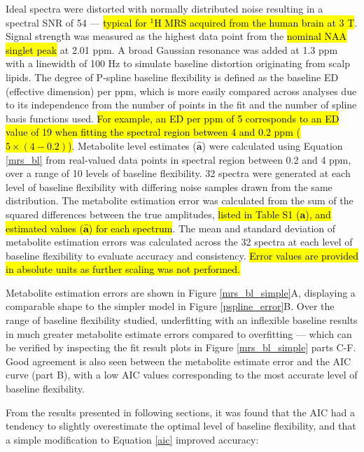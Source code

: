 \documentclass[num-refs]{wiley-article}
\newcommand{\revone}[2]{\hl{#1}\marginnote{\hl{#2}}}
\begin{document}
Ideal spectra were distorted with normally distributed noise resulting in a spectral SNR of 54 --- \revone{typical for $^1\mathrm{H}$ MRS acquired from the human brain at 3 T}{R2.6}. Signal strength was measured as the highest data point from the \revone{nominal NAA singlet peak}{R1.10} at 2.01 ppm. A broad Gaussian resonance was added at 1.3 ppm with a linewidth of 100 Hz to simulate baseline distortion originating from scalp lipids. The degree of P-spline baseline flexibility is defined as the baseline ED (effective dimension) per ppm, which is more easily compared across analyses due to its independence from the number of points in the fit and the number of spline basis functions used. \revone{For example, an ED per ppm of 5 corresponds to an ED value of 19 when fitting the spectral region between 4 and 0.2 ppm ($5 \times (4 - 0.2)$)}{R1.11}. Metabolite level estimates ($\hat{\mathbf{a}}$) were calculated using Equation \ref{mrs_bl} from real-valued data points in spectral region between 0.2 and 4 ppm, over a range of 10 levels of baseline flexibility. 32 spectra were generated at each level of baseline flexibility with differing noise samples drawn from the same distribution. The metabolite estimation error was calculated from the sum of the squared differences between the true amplitudes, \revone{listed in Table S1 ($\mathbf{a}$), and estimated values ($\hat{\mathbf{a}}$) for each spectrum}{R1.12,\\R1.13}. The mean and standard deviation of metabolite estimation errors was calculated across the 32 spectra at each level of baseline flexibility to evaluate accuracy and consistency. \revone{Error values are provided in absolute units as further scaling was not performed.}{R1.13}

Metabolite estimation errors are shown in Figure \ref{mrs_bl_simple}A, displaying a comparable shape to the simpler model in Figure \ref{pspline_error}B. Over the range of baseline flexibility studied, underfitting with an inflexible baseline results in much greater metabolite estimate errors compared to overfitting --- which can be verified by inspecting the fit result plots in Figure \ref{mrs_bl_simple} parts C-F. Good agreement is also seen between the metabolite estimate error and the AIC curve (part B), with a low AIC values corresponding to the most accurate level of baseline flexibility.

From the results presented in following sections, it was found that the AIC had a tendency to slightly overestimate the optimal level of baseline flexibility, and that a simple modification to Equation \ref{aic} improved accuracy:
\end{document}
